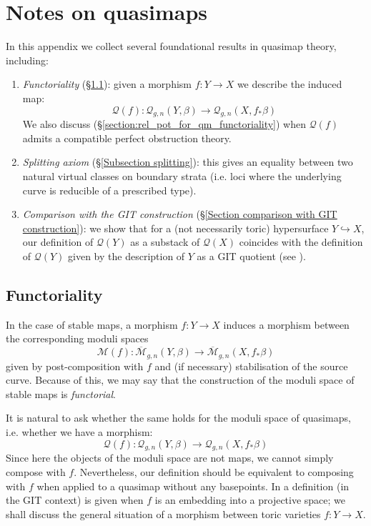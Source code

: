\documentclass[11pt]{amsart}
\newcommand{\M}[4]{\overline{\mathcal{M}}_{#1,#2}(#3,#4)}
\newcommand{\Q}[4]{\mathcal{Q}_{#1,#2}(#3,#4)}
\renewcommand{\to}{\rightarrow}
\newcommand{\om}[1]{\mathcal{#1}}
\theoremstyle{definition}
\theoremstyle{definition}
\newcommand{\ilemph}[1]{\emph{#1}}
\begin{document}
\section{Notes on quasimaps}\label{Section quasimap theory}
In this appendix we collect several foundational results in quasimap theory, including:
\begin{enumerate}
\item \ilemph{Functoriality} (\S \ref{Functoriality of Quasimap Spaces Section}): given a morphism $f\colon Y\to X$ we describe the induced map:
\begin{equation*} \om{Q}(f)\colon\Q{g}{n}{Y}{\beta}\to\Q{g}{n}{X}{f_*\beta} \end{equation*}
We also discuss (\S \ref{section:rel_pot_for_qm_functoriality}) when $\om{Q}(f)$ admits a compatible perfect obstruction theory.
\item \ilemph{Splitting axiom} (\S \ref{Subsection splitting}): this gives an equality between two natural virtual classes on boundary strata (i.e. loci where the underlying curve is reducible of a prescribed type).
\item \ilemph{Comparison with the GIT construction} (\S \ref{Section comparison with GIT construction}): we show that for a (not necessarily toric) hypersurface $Y \hookrightarrow X$, our definition of $\om{Q}(Y)$ as a substack of $\om{Q}(X)$ coincides with the definition of $\om{Q}(Y)$ given by the description of $Y$ as a GIT quotient (see \cite{CFKM}).
\end{enumerate}

\subsection{Functoriality} \label{Functoriality of Quasimap Spaces Section}

In the case of stable maps, a morphism $f : Y \to X$ induces a morphism between the corresponding moduli spaces
\begin{equation*}\om{M}(f) : \M{g}{n}{Y}{\beta} \rightarrow \M{g}{n}{X}{f_* \beta} \end{equation*}
given by post-composition with $f$ and (if necessary) stabilisation of the source curve. Because of this, we may say that the construction of the moduli space of stable maps is \ilemph{functorial}.

It is natural to ask whether the same holds for the moduli space of quasimaps, i.e. whether we have a morphism:
\begin{equation*} \om{Q}(f) : \Q{g}{n}{Y}{\beta} \to \Q{g}{n}{X}{f_* \beta} \end{equation*}
Since here the objects of the moduli space are not maps, we cannot simply compose with $f$. Nevertheless, our definition should be equivalent to composing with $f$ when applied to a quasimap without any basepoints. In \cite[Section 3.1]{CF-K-wallcrossing} a definition (in the GIT context) is given when $f$ is an embedding into a projective space; we shall discuss the general situation of a morphism between toric varieties $f\colon Y\to X$.
\end{document}
